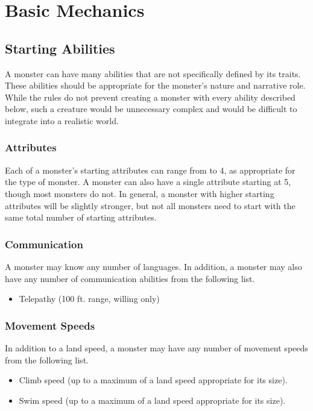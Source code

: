 \chapter{Basic Mechanics}

\section{Starting Abilities}

    A monster can have many abilities that are not specifically defined by its traits.
    These abilities should be appropriate for the monster's nature and narrative role.
    While the rules do not prevent creating a monster with every ability described below, such a creature would be unnecessary complex and would be difficult to integrate into a realistic world.

    \subsection{Attributes}
        Each of a monster's starting attributes can range from  to 4, as appropriate for the type of monster.
        A monster can also have a single attribute starting at 5, though most monsters do not.
        In general, a monster with higher starting attributes will be slightly stronger, but not all monsters need to start with the same total number of starting attributes.

    \subsection{Communication}
        A monster may know any number of languages.
        In addition, a monster may also have any number of communication abilities from the following list.
        \begin{itemize}
            \item Telepathy (100 ft. range, willing only)
        \end{itemize}

    \subsection{Movement Speeds}
        In addition to a land speed, a monster may have any number of movement speeds from the following list.
        \begin{itemize}
            \item Climb speed (up to a maximum of a land speed appropriate for its size).
            \item Swim speed (up to a maximum of a land speed appropriate for its size).
        \end{itemize}

